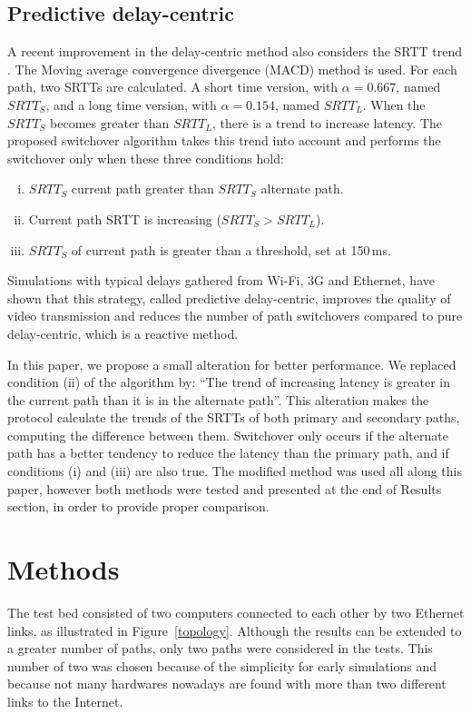 \documentclass[letterpaper,10pt,oneside,conference,final]{sbrt2015}
\begin{document}
  \subsection{Predictive delay-centric}

  A recent improvement in the delay-centric method also considers the SRTT trend \cite{Torres2014}. The Moving average convergence divergence (MACD) method is used. For each path, two SRTTs are calculated. A short time version, with $\alpha = 0.667$, named $SRTT_S$, and a long time version, with $\alpha = 0.154$, named $SRTT_L$. When the $SRTT_S$ becomes greater than $SRTT_L$, there is a trend to increase latency. The proposed switchover algorithm takes this trend into account and performs the switchover only when these three conditions hold:
\begin{enumerate}[i)]
 \item $SRTT_S$ current path greater than $SRTT_S$ alternate path.
 \item Current path SRTT is increasing ($SRTT_S > SRTT_L$).
 \item $SRTT_S$ of current path is greater than a threshold, set at 150\,ms.
\end{enumerate}

Simulations with typical delays gathered from Wi-Fi, 3G and Ethernet, have shown that this strategy, called predictive delay-centric, improves the quality of video transmission and reduces the number of path switchovers compared to pure delay-centric, which is a reactive method.

In this paper, we propose a small alteration for better performance. We replaced condition (ii) of the algorithm by: ``The trend of increasing latency is greater in the current path than it is in the alternate path''. This alteration makes the protocol calculate the trends of the SRTTs of both primary and secondary paths, computing the difference between them. Switchover only occurs if the alternate path has a better tendency to reduce the latency than the primary path, and if conditions (i) and (iii) are also true. The modified method was used all along this paper, however both methods were tested and presented at the end of Results section, in order to provide proper comparison.

\section{Methods}

The test bed consisted of two computers connected to each other by two Ethernet links, as illustrated in Figure~\ref{topology}. Although the results can be extended to a greater number of paths, only two paths were considered in the tests. This number of two was chosen because of the simplicity for early simulations and because not many hardwares nowadays are found with more than two different links to the Internet.
\end{document}
